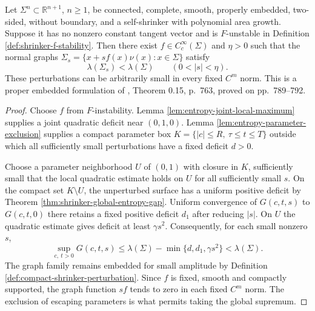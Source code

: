 \begin{theorem}\label{thm:shrinker-entropy-lowering}
Let $\Sigma^n\subset\mathbb R^{n+1}$, $n\geq1$, be connected, complete, smooth, properly embedded, two-sided, without boundary, and a self-shrinker with polynomial area growth. Suppose it has no nonzero constant tangent vector and is $F$-unstable in Definition \ref{def:shrinker-f-stability}. Then there exist $f\in C_c^\infty(\Sigma)$ and $\eta>0$ such that the normal graphs $\Sigma_s=\{x+sf(x)\nu(x):x\in\Sigma\}$ satisfy
\[
 \lambda(\Sigma_s)<\lambda(\Sigma)\qquad(0<|s|<\eta).
\]
These perturbations can be arbitrarily small in every fixed $C^m$ norm. This is a proper embedded formulation of \cite{CM12}, Theorem 0.15, p.~763, proved on pp.~789--792.
\end{theorem}
\begin{proof}
Choose $f$ from $F$-instability. Lemma \ref{lem:entropy-joint-local-maximum} supplies a joint quadratic deficit near $(0,1,0)$. Lemma \ref{lem:entropy-parameter-exclusion} supplies a compact parameter box $K=\{|c|\leq R,\ \tau\leq t\leq T\}$ outside which all sufficiently small perturbations have a fixed deficit $d>0$.

Choose a parameter neighborhood $U$ of $(0,1)$ with closure in $K$, sufficiently small that the local quadratic estimate holds on $U$ for all sufficiently small $s$. On the compact set $K\setminus U$, the unperturbed surface has a uniform positive deficit by Theorem \ref{thm:shrinker-global-entropy-gap}. Uniform convergence of $G(c,t,s)$ to $G(c,t,0)$ there retains a fixed positive deficit $d_1$ after reducing $|s|$. On $U$ the quadratic estimate gives deficit at least $\gamma s^2$. Consequently, for each small nonzero $s$,
\[
 \sup_{c,\ t>0}G(c,t,s)
 \leq\lambda(\Sigma)-\min\{d,d_1,\gamma s^2\}
 <\lambda(\Sigma).
\]
The graph family remains embedded for small amplitude by Definition \ref{def:compact-shrinker-perturbation}. Since $f$ is fixed, smooth and compactly supported, the graph function $sf$ tends to zero in each fixed $C^m$ norm. The exclusion of escaping parameters is what permits taking the global supremum.
\end{proof}

